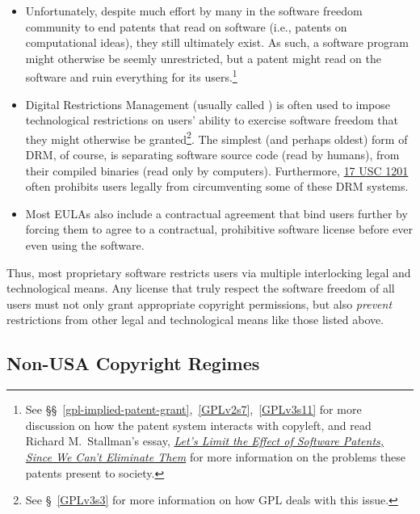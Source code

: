 \begin{itemize}

\item Unfortunately, despite much effort by many in the software freedom
  community to end patents that read on software (i.e., patents on
  computational ideas), they still ultimately exist.  As such, a software
  program might otherwise be seemly unrestricted, but a patent might read on
  the software and ruin everything for its users.\footnote{See
  \S\S~\ref{gpl-implied-patent-grant},~\ref{GPLv2s7},~\ref{GPLv3s11} for more
  discussion on how the patent system interacts with copyleft, and read
  Richard M.~Stallman's essay,
  \href{http://www.wired.com/opinion/2012/11/richard-stallman-software-patents/}{\textit{Let’s
      Limit the Effect of Software Patents, Since We Can’t Eliminate Them}}
  for more information on the problems these patents present to society.}

\item Digital Restrictions Management (usually called ) is often
  used to impose technological restrictions on users' ability to exercise
  software freedom that they might otherwise be granted\footnote{See
    \S~\ref{GPLv3s3} for more information on how GPL deals with this issue.}.
  The simplest (and perhaps oldest) form of DRM, of course, is separating
  software source code (read by humans), from their compiled binaries (read
  only by computers).  Furthermore,
  \href{http://www.law.cornell.edu/uscode/text/17/1201}{17 USC 1201} often
  prohibits users legally from circumventing some of these DRM systems.

\item Most EULAs also include a contractual agreement that bind users further
  by forcing them to agree to a contractual, prohibitive software license
  before ever even using the software.

\end{itemize}

Thus, most proprietary software restricts users via multiple interlocking
legal and technological means.  Any license that truly respect the software
freedom of all users must not only grant appropriate copyright permissions,
but also \textit{prevent} restrictions from other legal and technological
means like those listed above.

\subsection{Non-USA Copyright Regimes}
\label{non-usa-copyright}

